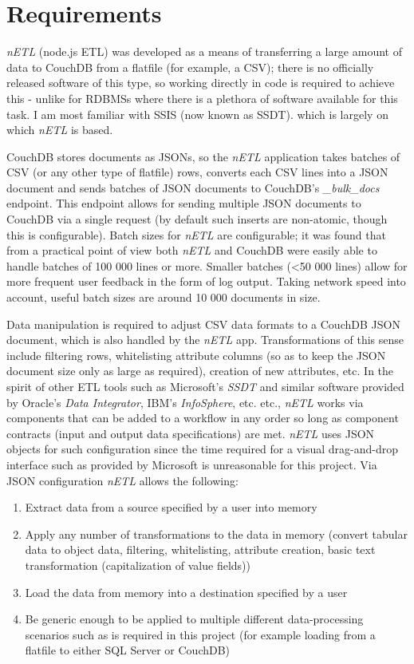 
\section{Requirements}
\textit{nETL} (node.js ETL) was developed as a means of transferring a large amount of data to CouchDB from a flatfile (for example, a CSV); there is no officially released software of this type, so working directly in code is required to achieve this - unlike for RDBMSs where there is a plethora of software available for this task. I am most familiar with SSIS (now known as SSDT). which is largely on which \textit{nETL} is based.

CouchDB stores documents as JSONs, so the \textit{nETL} application takes batches of CSV (or any other type of flatfile) rows, converts each CSV lines into a JSON document and sends batches of JSON documents to CouchDB's \textit{\_bulk\_docs} endpoint. This endpoint allows for sending multiple JSON documents to CouchDB via a single request (by default such inserts are non-atomic, though this is configurable). Batch sizes for \textit{nETL} are configurable; it was found that from a practical point of view both \textit{nETL} and CouchDB were easily able to handle batches of 100 000 lines or more. Smaller batches (\textless 50 000 lines) allow for more frequent user feedback in the form of log output. Taking network speed into account, useful batch sizes are around 10 000 documents in size.

Data manipulation is required to adjust CSV data formats to a CouchDB JSON document, which is also handled by the \textit{nETL} app. Transformations of this sense include filtering rows, whitelisting attribute columns (so as to keep the JSON document size only as large as required), creation of new attributes, etc. In the spirit of other ETL tools such as Microsoft's \textit{SSDT} and similar software provided by Oracle's \textit{Data Integrator}, IBM's \textit{InfoSphere}, etc. etc., \textit{nETL} works via components that can be added to a workflow in any order so long as component contracts (input and output data specifications) are met. \textit{nETL} uses JSON objects for such configuration since the time required for a visual drag-and-drop interface such as provided by Microsoft is unreasonable for this project. Via JSON configuration \textit{nETL} allows the following:

\begin{enumerate}
    \item Extract data from a source specified by a user into memory
    \item Apply any number of transformations to the data in memory (convert tabular data to object data, filtering, whitelisting, attribute creation, basic text transformation (capitalization of value fields))
    \item Load the data from memory into a destination specified by a user
    \item Be generic enough to be applied to multiple different data-processing scenarios such as is required in this project (for example loading from a flatfile to either SQL Server or CouchDB)
\end{enumerate}